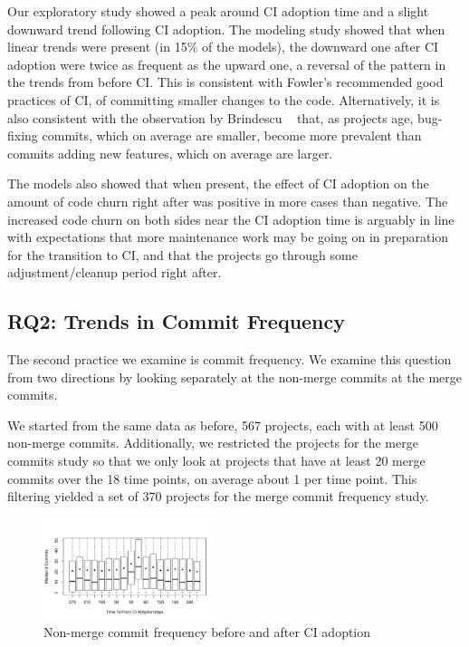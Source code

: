 Our exploratory study showed a peak around CI adoption time and a slight 
downward trend following CI adoption.
The modeling study showed that when linear trends were present (in 15\% 
of the models), the downward one after CI adoption were twice as frequent 
as the upward one, a reversal of the pattern in the trends from before CI.
This is consistent with Fowler's recommended good practices of CI, of 
committing smaller changes to the code.
Alternatively, it is also consistent with the observation by Brindescu 
\etal~\cite{brindescu2014centralized} that, as projects age, bug-fixing 
commits, which on average are smaller, become more prevalent than 
commits adding new features, which on average are larger.

The models also showed that when present, the effect of CI adoption on the 
amount of code churn right after was positive in more cases than negative.
The increased code churn on both sides near the CI adoption time is 
arguably in line with expectations that more maintenance work may be 
going on in preparation for the transition to CI, and that the projects go 
through some adjustment/cleanup period right after.


\subsection{RQ2: Trends in Commit Frequency}

The second practice we examine is commit frequency.
We examine this question from two directions by looking separately at the non-merge commits at the merge commits. 

We started from the same data as before, 567 projects, each with at least 500 
non-merge commits.
Additionally, we restricted the projects for the  merge commits study so that we only look at projects that have at least 20 merge commits over the 18 time points, \ie on average about 1 per time point.
This filtering yielded a set of 370 projects for the merge commit frequency study.

\begin{figure}[!t]
\centering
\includegraphics[width=0.45\textwidth, clip=true, trim=0 15 15 50]{numbercommits.pdf}
\caption{Non-merge commit frequency before and after CI adoption}
\label{Fig:NumberCommits}
\end{figure}

